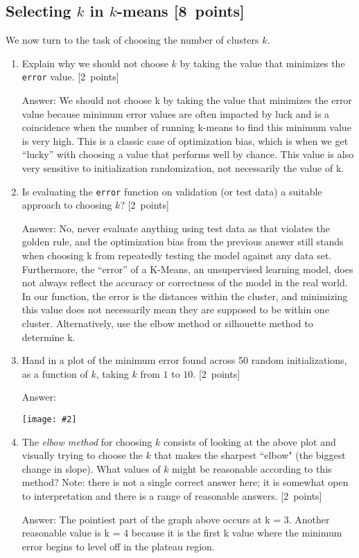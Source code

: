 \documentclass{article}
\newcommand{\blu}[1]{{\textcolor{blu}{#1}}}
\newcommand{\gre}[1]{\textcolor{gre}{#1}}
\newcommand\ans[1]{\par\gre{Answer: #1}}
\let\ask\blu
\newcommand\pts[1]{\textcolor{pointscolour}{[#1~points]}}
\newcommand{\centerfig}[2]{\begin{center}\texttt{[image: \#2]}\end{center}}
\begin{document}
    \clearpage
    \subsection{Selecting $k$ in $k$-means \pts{8}}

    We now turn to the task of choosing the number of clusters $k$.

    \begin{enumerate}
        \item \ask{Explain why we should not choose $k$ by taking the value that minimizes the \texttt{error} value.} \pts{2}
        \ans{We should not choose k by taking the value that minimizes the error value because minimum error values are often impacted by luck and is a coincidence when the number of running k-means to find this minimum value is very high. This is a classic case of optimization bias, which is when we get “lucky” with choosing a value that performs well by chance. This value is also very sensitive to initialization randomization, not necessarily the value of k.}
        \item \ask{Is evaluating the \texttt{error} function on validation (or test data) a suitable approach to choosing $k$?} \pts{2}
        
        \ans{No, never evaluate anything using test data as that violates the golden rule, and the optimization bias from the previous answer still stands when choosing k from repeatedly testing the model against any data set. Furthermore, the “error” of a K-Means, an unsupervised learning model, does not always reflect the accuracy or correctness of the model in the real world. In our function, the error is the distances within the cluster, and minimizing this value does not necessarily mean they are supposed to be within one cluster. Alternatively, use the elbow method or silhouette method to determine k.}
        
        \item \ask{Hand in a plot of the minimum error found across 50 random initializations, as a function of $k$, taking $k$ from $1$ to $10$.} \pts{2}
        \ans{}
        \centerfig{.7}{figs/kmeans minimum error vs k.png}
        \item The \emph{elbow method} for choosing $k$ consists of looking at the above plot and visually trying to choose the $k$ that makes the sharpest ``elbow" (the biggest change in slope). \ask{What values of $k$ might be reasonable according to this method?} Note: there is not a single correct answer here; it is somewhat open to interpretation and there is a range of reasonable answers. \pts{2}
        
        \ans{The pointiest part of the graph above occurs at k = 3. Another reasonable value is k = 4 because it is the first k value where the minimum error begins to level off in the plateau region.}
    \end{enumerate}
\end{document}
